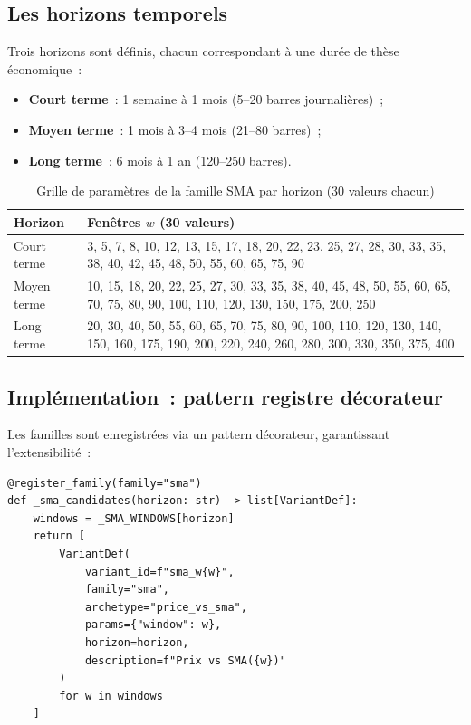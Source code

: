 \subsection{Les horizons temporels}

Trois horizons sont définis, chacun correspondant à une durée de thèse économique~:

\begin{itemize}
    \item \textbf{Court terme}~: 1 semaine à 1 mois (5--20 barres journalières)~;
    \item \textbf{Moyen terme}~: 1 mois à 3--4 mois (21--80 barres)~;
    \item \textbf{Long terme}~: 6 mois à 1 an (120--250 barres).
\end{itemize}

\begin{table}[H]
\centering
\caption{Grille de paramètres de la famille SMA par horizon (30 valeurs chacun)}
\label{tab:sma_grid}
\begin{tabularx}{\linewidth}{@{}lY@{}}
\toprule
\textbf{Horizon} & \textbf{Fenêtres $w$ (30 valeurs)} \\
\midrule
Court terme  & 3, 5, 7, 8, 10, 12, 13, 15, 17, 18, 20, 22, 23, 25, 27, 28, 30, 33, 35, 38, 40, 42, 45, 48, 50, 55, 60, 65, 75, 90 \\
Moyen terme  & 10, 15, 18, 20, 22, 25, 27, 30, 33, 35, 38, 40, 45, 48, 50, 55, 60, 65, 70, 75, 80, 90, 100, 110, 120, 130, 150, 175, 200, 250 \\
Long terme   & 20, 30, 40, 50, 55, 60, 65, 70, 75, 80, 90, 100, 110, 120, 130, 140, 150, 160, 175, 190, 200, 220, 240, 260, 280, 300, 330, 350, 375, 400 \\
\bottomrule
\end{tabularx}
\end{table}

\subsection{Implémentation~: pattern registre décorateur}

Les familles sont enregistrées via un pattern décorateur, garantissant
l'extensibilité~:

\begin{lstlisting}[caption={Pattern d'enregistrement des familles d'indicateurs (Layer A)},label={lst:register_family}]
@register_family(family="sma")
def _sma_candidates(horizon: str) -> list[VariantDef]:
    windows = _SMA_WINDOWS[horizon]
    return [
        VariantDef(
            variant_id=f"sma_w{w}",
            family="sma",
            archetype="price_vs_sma",
            params={"window": w},
            horizon=horizon,
            description=f"Prix vs SMA({w})"
        )
        for w in windows
    ]
\end{lstlisting}

